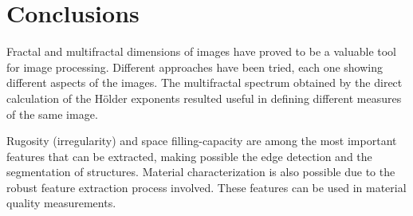 \documentclass[oneside,a4paper,english,links,12pt]{article}
\begin{document}
\section{Conclusions}
Fractal and multifractal dimensions of images have proved to be a valuable tool for image processing. Different approaches have been tried, each one showing different aspects of the images. The multifractal spectrum obtained by the direct calculation of the H\"older exponents resulted useful in defining different measures of the same image.

Rugosity (irregularity) and space filling-capacity are among the most important features that can be extracted, making possible the edge detection and the segmentation of structures. Material characterization is also possible due to the robust feature extraction process involved. These features can be used in material quality measurements.



\end{document}
